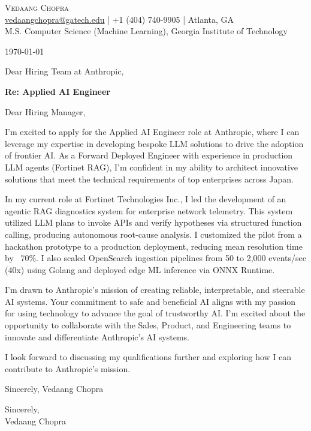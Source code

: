 \documentclass[letterpaper,11pt]{article}
\newcommand{\letterPara}[1]{\noindent #1 \vspace{10pt}}
\begin{document}
\begin{center}
  {\LARGE \scshape Vedaang Chopra} \\ \vspace{4pt}
  \small \href{mailto:vedaangchopra@gatech.edu}{vedaangchopra@gatech.edu} \;|\; +1 (404) 740-9905 \;|\; Atlanta, GA \\ \vspace{2pt}
  \small M.S. Computer Science (Machine Learning), Georgia Institute of Technology
\end{center}
\vspace{-8pt}

\hfill \small \today

\noindent Dear Hiring Team at Anthropic,

\noindent \textbf{Re: Applied AI Engineer}\n

\letterPara{Dear Hiring Manager,}

\letterPara{I'm excited to apply for the Applied AI Engineer role at Anthropic, where I can leverage my expertise in developing bespoke LLM solutions to drive the adoption of frontier AI. As a Forward Deployed Engineer with experience in production LLM agents (Fortinet RAG), I'm confident in my ability to architect innovative solutions that meet the technical requirements of top enterprises across Japan.}

\letterPara{In my current role at Fortinet Technologies Inc., I led the development of an agentic RAG diagnostics system for enterprise network telemetry. This system utilized LLM plans to invoke APIs and verify hypotheses via structured function calling, producing autonomous root-cause analysis. I customized the pilot from a hackathon prototype to a production deployment, reducing mean resolution time by ~70\%. I also scaled OpenSearch ingestion pipelines from 50 to 2,000 events/sec (40x) using Golang and deployed edge ML inference via ONNX Runtime.}

\letterPara{I'm drawn to Anthropic's mission of creating reliable, interpretable, and steerable AI systems. Your commitment to safe and beneficial AI aligns with my passion for using technology to advance the goal of trustworthy AI. I'm excited about the opportunity to collaborate with the Sales, Product, and Engineering teams to innovate and differentiate Anthropic's AI systems.}

\letterPara{I look forward to discussing my qualifications further and exploring how I can contribute to Anthropic's mission.}

\letterPara{Sincerely,
Vedaang Chopra}

\noindent Sincerely,\\[4pt] Vedaang Chopra
\end{document}
